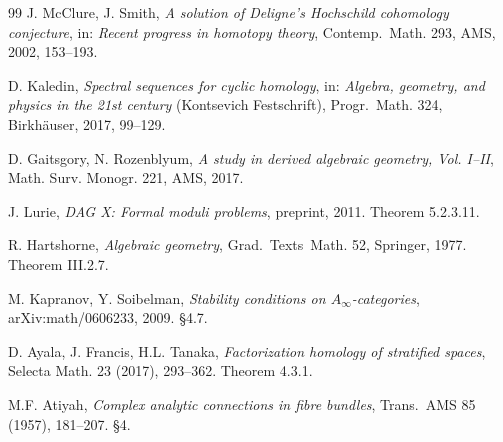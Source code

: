 \documentclass[11pt,reqno]{amsart}
\theoremstyle{plain}
\theoremstyle{definition}
\theoremstyle{remark}
\begin{document}
\begin{thebibliography}{99}
 J. McClure, J. Smith, \emph{A solution of Deligne's Hochschild cohomology conjecture}, in: \emph{Recent progress in homotopy theory}, Contemp.~Math. 293, AMS, 2002, 153--193.

 D. Kaledin, \emph{Spectral sequences for cyclic homology}, in: \emph{Algebra, geometry, and physics in the 21st century} (Kontsevich Festschrift), Progr.~Math. 324, Birkh\"auser, 2017, 99--129.

 D. Gaitsgory, N. Rozenblyum, \emph{A study in derived algebraic geometry, Vol. I--II}, Math. Surv. Monogr. 221, AMS, 2017.

 J. Lurie, \emph{DAG X: Formal moduli problems}, preprint, 2011. Theorem 5.2.3.11.

 R. Hartshorne, \emph{Algebraic geometry}, Grad.~Texts~Math. 52, Springer, 1977. Theorem III.2.7.

 M. Kapranov, Y. Soibelman, \emph{Stability conditions on $A_\infty$-categories}, arXiv:math/0606233, 2009. \S4.7.

 D. Ayala, J. Francis, H.L. Tanaka, \emph{Factorization homology of stratified spaces}, Selecta Math. 23 (2017), 293--362. Theorem 4.3.1.

 M.F. Atiyah, \emph{Complex analytic connections in fibre bundles}, Trans.~AMS 85 (1957), 181--207. \S4.

\end{thebibliography}
\end{document}
